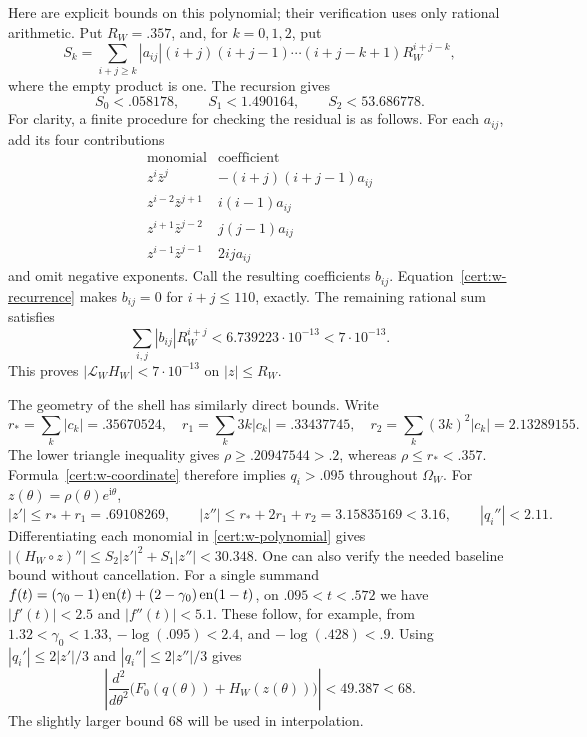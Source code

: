 Here are explicit bounds on this polynomial; their verification uses
only rational arithmetic.  Put $R_W=.357$, and, for $k=0,1,2$, put
\[
 S_k=\sum_{i+j\ge k}|a_{ij}|(i+j)(i+j-1)\cdots(i+j-k+1)
                      R_W^{i+j-k},
\]
where the empty product is one.  The recursion gives
\begin{equation}
 S_0<.058178,
 \qquad S_1<1.490164,
 \qquad S_2<53.686778.
 \label{cert:w-norms}
\end{equation}
For clarity, a finite procedure for checking the residual is as follows.
For each $a_{ij}$, add its four contributions
\[
 \begin{array}{c|c}
 \text{monomial}&\text{coefficient}\\ \hline
 z^i\bar z^j&-(i+j)(i+j-1)a_{ij}\\
 z^{i-2}\bar z^{j+1}&i(i-1)a_{ij}\\
 z^{i+1}\bar z^{j-2}&j(j-1)a_{ij}\\
 z^{i-1}\bar z^{j-1}&2ij a_{ij}
 \end{array}
\]
and omit negative exponents.  Call the resulting coefficients $b_{ij}$.
Equation~\eqref{cert:w-recurrence} makes $b_{ij}=0$ for $i+j\le110$,
exactly.  The remaining rational sum satisfies
\begin{equation}
 \sum_{i,j}|b_{ij}|R_W^{i+j}<6.739223\cdot10^{-13}<7\cdot10^{-13}.
 \label{cert:w-residual}
\end{equation}
This proves $|\mathcal L_WH_W|<7\cdot10^{-13}$ on $|z|\le R_W$.

The geometry of the shell has similarly direct bounds.  Write
\[
 r_* =\sum_k|c_k|=.35670524,\quad
 r_1=\sum_k3k|c_k|=.33437745,\quad
 r_2=\sum_k(3k)^2|c_k|=2.13289155.
\]
The lower triangle inequality gives $\rho\ge.20947544>.2$, whereas
$\rho\le r_*<.357$.  Formula~\eqref{cert:w-coordinate} therefore implies
$q_i>.095$ throughout $\Omega_W$.  For $z(\theta)=\rho(\theta)e^{\mathrm i\theta}$,
\begin{equation}
 |z'|\le r_*+r_1=.69108269,
 \qquad |z''|\le r_*+2r_1+r_2=3.15835169<3.16,
 \qquad |q_i''|<2.11.
 \label{cert:w-curve-derivatives}
\end{equation}
Differentiating each monomial in \eqref{cert:w-polynomial} gives
$|(H_W\circ z)''|\le S_2|z'|^2+S_1|z''|<30.348$.
One can also verify the needed baseline bound without cancellation.
For a single summand
$f(t)=(\gamma _0-1)\operatorname{en}(t)+(2-\gamma _0)\operatorname{en}(1-t)$, on
$.095<t<.572$ we have $|f'(t)|<2.5$ and $|f''(t)|<5.1$.
These follow, for example, from $1.32<\gamma _0<1.33$,
$-\log(.095)<2.4$, and $-\log(.428)<.9$.
Using $|q_i'|\le2|z'|/3$ and $|q_i''|\le2|z''|/3$ gives
\begin{equation}
 \left|\frac{d^2}{d\theta^2}
       \bigl(F_0(q(\theta))+H_W(z(\theta))\bigr)\right|
 <49.387<68.
 \label{cert:w-curvature}
\end{equation}
The slightly larger bound 68 will be used in interpolation.

